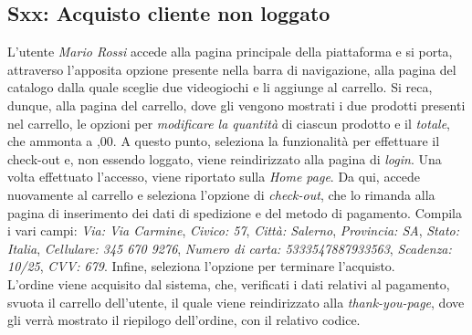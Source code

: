 \documentclass[12pt, a4paper, oneside]{book}
\begin{document}
    \subsection*{Sxx: Acquisto cliente non loggato}
    L'utente \textit{Mario Rossi} accede alla pagina principale della piattaforma e si porta, attraverso l'apposita opzione presente nella barra di navigazione, alla pagina del catalogo dalla quale sceglie due videogiochi e li aggiunge al carrello. Si reca, dunque, alla pagina del carrello, dove gli vengono mostrati i due prodotti presenti nel carrello, le opzioni per \textit{modificare la quantità} di ciascun prodotto e il \textit{totale}, che ammonta a ,00. A questo punto, seleziona la funzionalità per effettuare il check-out e, non essendo loggato, viene reindirizzato alla pagina di \textit{login}. Una volta effettuato l'accesso, viene riportato sulla \textit{Home page}. Da qui, accede nuovamente al carrello e seleziona l'opzione di \textit{check-out}, che lo rimanda alla pagina di inserimento dei dati di spedizione e del metodo di pagamento. Compila i vari campi: \textit{Via: Via Carmine}, \textit{Civico: 57}, \textit{Città: Salerno}, \textit{Provincia: SA}, \textit{Stato: Italia}, \textit{Cellulare: 345 670 9276}, \textit{Numero di carta: 5333547887933563}, \textit{Scadenza: 10/25}, \textit{CVV: 679}. Infine, seleziona l'opzione per terminare l'acquisto.\\
    L'ordine viene acquisito dal sistema, che, verificati i dati relativi al pagamento, svuota il carrello dell'utente, il quale viene reindirizzato alla \textit{thank-you-page}, dove gli verrà mostrato il riepilogo dell'ordine, con il relativo codice.
\end{document}
